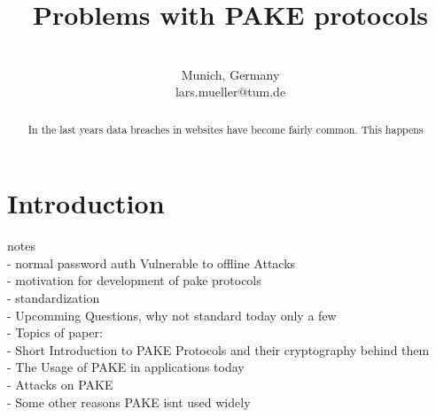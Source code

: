 \documentclass[journal]{IEEEtran}
\begin{document}
\title{Problems with PAKE protocols\\ %
}

\author{
 \\
Munich, Germany \\
lars.mueller@tum.de}

\maketitle

\begin{abstract}
In the last years data breaches in websites have become fairly common.
This happens 
\end{abstract}

\begin{IEEEkeywords}
\end{IEEEkeywords}

\section{Introduction}
notes \\
- normal password auth Vulnerable to offline Attacks \\
- motivation for development of pake protocols \\
- standardization  \\
- Upcomming Questions, why not standard today only a few  \\
- Topics of paper: \\
    - Short Introduction to PAKE Protocols and their cryptography behind them \\
    - The Usage of PAKE in applications today \\
    - Attacks on PAKE \\
    - Some other reasons PAKE isnt used widely \\
\end{document}
